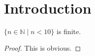 %

\section{Introduction}

\begin{lemma}
  \label{lem:finite_test}
  \leanok
  $\{ n \in \mathbb{N} \mid n < 10 \}$ is finite.
\end{lemma}
  
\begin{proof}
  \leanok
  This is obvious.
\end{proof}

\begin{lemma}

\end{lemma}